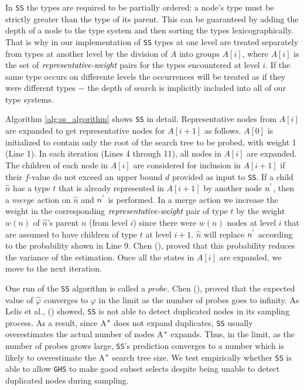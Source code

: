 In \texttt{SS} the types are required to be partially ordered: a node's type must be strictly greater than the type of its parent. This can be guaranteed by adding the depth of a node to the type system and then sorting the types lexicographically. That is why in our implementation of \texttt{SS} types at one level are treated separately from types at another level by the division of $A$ into groups $A[i]$, where $A[i]$ is the set of $\emph{representative-weight}$ pairs for the types encountered at level $i$. If the same type occurs on differente levels the occurrences will be treated as if they were different types $-$ the depth of search is implicitly included into all of our type systems.

Algorithm \ref{alg:ss_algorithm} shows \texttt{SS} in detail. Representative nodes from $A[i]$ are expanded to get representative nodes for $A[i+1]$ as follows. $A[0]$ is initialized to contain only the root of the search tree to be probed, with weight 1 (Line 1). In each iteration (Lines 4 through 11), all nodes in $A[i]$ are expanded. The children of each node in $A[i]$ are considered for inclusion in $A[i+1]$ if their $f$-value do not exceed an upper bound $d$ provided as input to \texttt{SS}. If a child $\hat{n}$ has a type $t$ that is already represented in $A[i+1]$ by another node $n\sp{'}$, then a $merge$ action on $\hat{n}$ and $n\sp{'}$ is performed. In a merge action we increase the weight in the corresponding $\emph{representative-weight}$ pair of type $t$ by the weight $w(n)$ of $\hat{n}$'s parent $n$ (from level $i$) since there were $w(n)$ nodes at level $i$ that are assumed to have children of type $t$ at level $i+1$. $\hat{n}$ will replace $n\sp{'}$ according to the probability shown in Line 9. Chen (\citeyear{chen1992heuristic}), proved that this probability reduces the variance of the estimation. Once all the states in $A[i]$ are expanded, we move to the next iteration.

One run of the \texttt{SS} algorithm is called a $probe$. Chen (\citeyear{chen1992heuristic}), proved that the expected value of $\hat{\varphi}$ converges to $\varphi$ in the limit as the number of probes goes to infinity. As Lelis et al., (\citeyear{lelis2014estimating}) showed, \texttt{SS} is not able to detect duplicated nodes in its sampling process. As a result, since A$\sp{*}$ does not expand duplicates, \texttt{SS} usually overestimates the actual number of nodes A$\sp{*}$ expands. Thus, in the limit, as the number of probes grows large, \texttt{SS}'s prediction converges to a number which  is likely to overestimate the A$\sp{*}$ search tree size. We test empirically whether \texttt{SS} is able to allow \texttt{GHS} to make good subset selects despite being unable to detect duplicated nodes during sampling.

